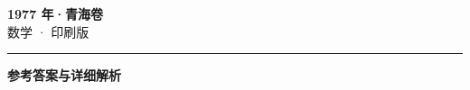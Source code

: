 \documentclass[zihao=5, a4paper]{ctexart}
\begin{document}
\begin{center}
  {\Large\bfseries 1977 年·青海卷}\\[4pt]
  {\large 数学 · 印刷版}
\end{center}
\medskip
{}

\par\bigskip\hrule\bigskip
{}
\begin{center}{\large\bfseries 参考答案与详细解析}\end{center}
\smallskip

\end{document}
